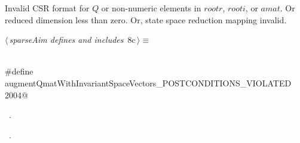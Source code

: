 \documentclass{article}
\begin{document}
\begin{description}
\begin{description}
\begin{flushleft}
\begin{minipage}{\linewidth}
\begin{list}{}{\setlength{\itemsep}{-\parsep}\setlength{\itemindent}{-\leftmargin}}
\item{}
\end{list}
\end{minipage}\vspace{4ex}
\end{flushleft}
\item[{\bf augmentQmatWithInvariantSpaceVectors\_POSTCONDITIONS\_VIOLATED}]
Invalid CSR format for $Q$ or non-numeric elements in $rootr$, $rooti$, or
$amat$. Or reduced dimension less than zero. Or, state space reduction mapping invalid.
\begin{flushleft} \small
\begin{minipage}{\linewidth}\label{scrap7}\raggedright\small
{} $\langle\,${\itshape sparseAim defines and includes}\nobreak\ {\footnotesize {8c}}$\,\rangle\equiv$
\vspace{-1ex}
\begin{list}{}{} \item
\mbox{}\verb@@\\
\mbox{}\verb@#define augmentQmatWithInvariantSpaceVectors_POSTCONDITIONS_VIOLATED 2004@\\
\mbox{}\verb@@{\NWsep}
\end{list}
\vspace{-1.5ex}
\footnotesize
\begin{list}{}{\setlength{\itemsep}{-\parsep}\setlength{\itemindent}{-\leftmargin}}
\item \NWtxtMacroDefBy\ .
\item \NWtxtMacroRefIn\ .


\end{list}
\end{minipage}
\end{flushleft}
\end{description}
\end{description}
\end{document}
